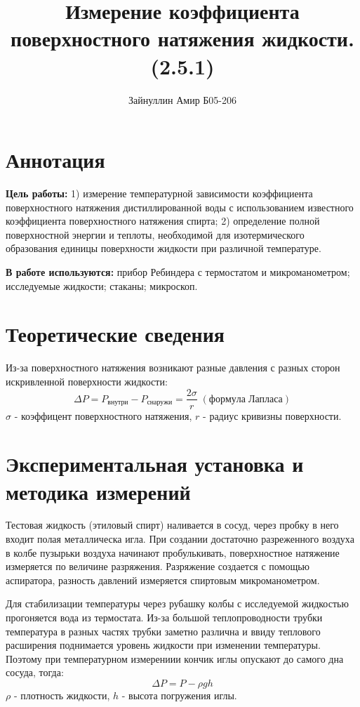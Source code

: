 \documentclass[a4paper,12pt]{article}
\title{\textbf{Измерение коэффициента поверхностного натяжения жидкости. (2.5.1)}}
\author{Зайнуллин Амир Б05-206}
\begin{document}
\maketitle

\section{Аннотация}

\textbf{Цель работы:} 
1) измерение температурной зависимости  коэффициента поверхностного натяжения дистиллированной воды с использованием известного коэффициента поверхностного натяжения спирта; 2) определение полной поверхностной энергии  и теплоты, необходимой для изотермического образования единицы  поверхности жидкости  при различной температуре.
	
\textbf{В работе используются:} 
прибор  Ребиндера  с термостатом и микроманометром; исследуемые жидкости; стаканы; микроскоп.
	
\section{Теоретические сведения}
Из-за поверхностного натяжения возникают разные давления с разных сторон искривленной поверхности жидкости:
\begin{equation}
\Delta P = P_{внутри} - P_{снаружи} = \frac{2\sigma}{r} \;(формула\; Лапласа)
\end{equation}
$\sigma$ - коэффицент поверхностного натяжения, $r$ - радиус кривизны поверхности.

\section{Экспериментальная установка и методика измерений}

Тестовая жидкость (этиловый спирт) наливается в сосуд, через пробку в него входит полая металлическа игла. При создании достаточно разреженного воздуха в колбе пузырьки воздуха начинают пробулькивать, поверхностное натяжение измеряется по величине разряжения. Разряжение создается с помощью аспиратора, разность давлений измеряется спиртовым микроманометром.

Для стабилизации температуры через рубашку колбы с исследуемой жидкостью прогоняется вода из термостата. Из-за большой теплопроводности трубки температура в разных частях трубки заметно различна и ввиду теплового расширения поднимается уровень жидкости при изменении температуры. Поэтому при температурном измерениии кончик иглы опускают до самого дна сосуда, тогда:
\begin{equation}
\Delta P = P - \rho g h
\end{equation}
$\rho$ - плотность жидкости, $h$ - высота погружения иглы.
\end{document}
